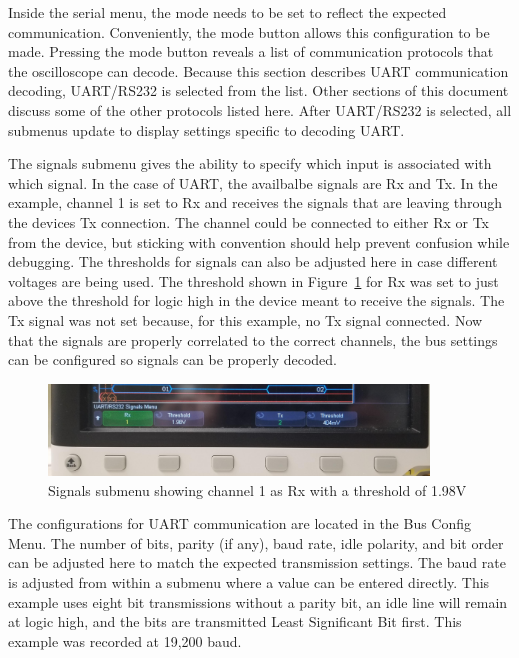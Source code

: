 \documentclass{article}
\begin{document}
  Inside the serial menu, the mode needs to be set to reflect the expected
  communication. Conveniently, the mode button allows this configuration to be
  made. Pressing the mode button reveals a list of communication protocols that
  the oscilloscope can decode. Because this section describes UART communication
  decoding, UART/RS232 is selected from the list. Other sections of this
  document discuss some of the other protocols listed here. After UART/RS232 is
  selected, all submenus update to display settings
  specific to decoding UART.

  The signals submenu gives the ability to specify which input is associated
  with which signal. In the case of UART, the availbalbe signals are Rx and Tx.
  In the example, channel 1 is set to Rx and receives the signals that are
  leaving through the devices Tx connection. The channel could be connected to
  either Rx or Tx from the device, but sticking with convention should help
  prevent confusion while debugging. The thresholds for signals can also be
  adjusted here in case different voltages are being used. The threshold shown
  in Figure~\ref{fig:uart_signals_menu} for Rx was set to just above the
  threshold for logic high in the device meant to receive the signals. The Tx
  signal was not set because, for this example, no Tx signal connected. Now that
  the signals are properly correlated to the correct channels, the bus settings
  can be configured so signals can be properly decoded.

  \clearpage

  \begin{figure}[h]
    \centering
    \includegraphics[width=0.9\textwidth]{images/uart/signals_menu.jpg}
    \caption{Signals submenu showing channel 1 as Rx with a threshold of 1.98V}
    \label{fig:uart_signals_menu}
  \end{figure}

  The configurations for UART communication are located in the Bus Config Menu.
  The number of bits, parity (if any), baud rate, idle polarity, and bit order
  can be adjusted here to match the expected transmission settings. The baud
  rate is adjusted from within a submenu where a value can be entered directly.
  This example uses eight bit transmissions without a parity bit, an idle line
  will remain at logic high, and the bits are transmitted Least Significant
  Bit first. This example was recorded at 19,200 baud.
\end{document}
